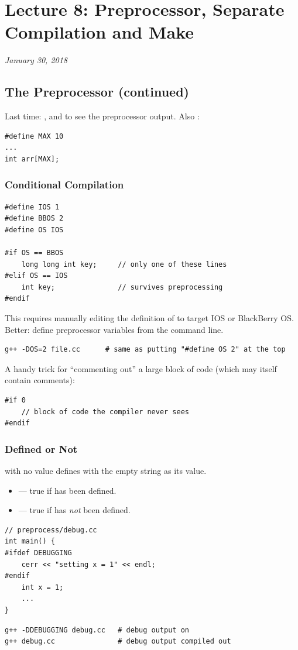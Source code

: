\chapter{Lecture 8: Preprocessor, Separate Compilation and Make}
\begin{center}
\textit{January 30, 2018}
\end{center}

\section{The Preprocessor (continued)}
Last time: , and  to see the
preprocessor output. Also :
\begin{lstlisting}[style=cpp]
#define MAX 10
...
int arr[MAX];
\end{lstlisting}

\subsection{Conditional Compilation}
\begin{lstlisting}[style=cpp]
#define IOS 1
#define BBOS 2
#define OS IOS

#if OS == BBOS
    long long int key;     // only one of these lines
#elif OS == IOS
    int key;               // survives preprocessing
#endif
\end{lstlisting}
This requires manually editing the definition of  to target IOS or
BlackBerry OS. Better: define preprocessor variables from the command line.
\begin{lstlisting}[style=bash]
g++ -DOS=2 file.cc      # same as putting "#define OS 2" at the top
\end{lstlisting}

A handy trick for ``commenting out'' a large block of code (which may itself
contain \code{/* */} comments):
\begin{lstlisting}[style=cpp]
#if 0
    // block of code the compiler never sees
#endif
\end{lstlisting}

\subsection{Defined or Not}
 with no value defines  with the empty string as its
value.
\begin{itemize}
  \item {} --- true if  has been defined.
  \item {} --- true if  has \emph{not} been defined.
\end{itemize}
\begin{lstlisting}[style=cpp]
// preprocess/debug.cc
int main() {
#ifdef DEBUGGING
    cerr << "setting x = 1" << endl;
#endif
    int x = 1;
    ...
}
\end{lstlisting}
\begin{lstlisting}[style=bash]
g++ -DDEBUGGING debug.cc   # debug output on
g++ debug.cc               # debug output compiled out
\end{lstlisting}

